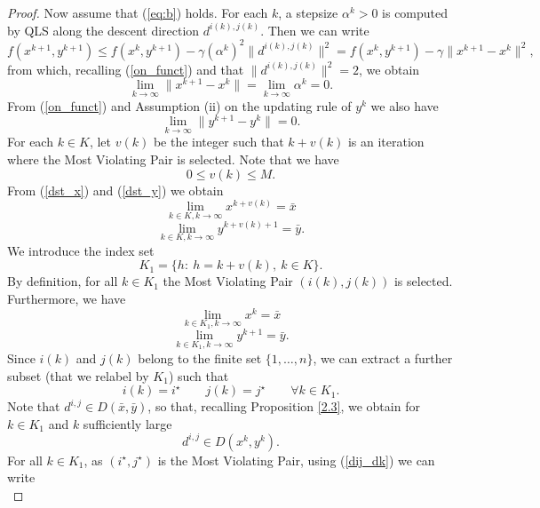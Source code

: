 \begin{proof}
Now assume that (\ref{eq:b}) holds.
For each $k$, a stepsize $\alpha^k>0$ is computed by QLS along the descent direction $d^{i(k),j(k)}$.
Then we can write
\begin{equation}\label{red_funct}
 f(x^{k+1},y^{k+1})\le f(x^k,y^{k+1})-\gamma (\alpha^k)^2\|d^{i(k),j(k)}\|^2=f(x^k,y^{k+1})-\gamma\|x^{k+1}-x^k\|^2,
\end{equation}
from which, recalling (\ref{on_funct}) and that $\|d^{i(k),j(k)}\|^2=2$, we obtain
\begin{equation}\label{dst_x}
 \lim_{k\to\infty}\|x^{k+1}-x^k\|=\lim_{k\to\infty}\alpha^k=0.
\end{equation} 
From (\ref{on_funct}) and Assumption (ii) on the updating rule of $y^k$ we also have
\begin{equation}\label{dst_y}
 \lim_{k\to\infty}\|y^{k+1}-y^k\|=0.
\end{equation}
For each $k\in K$, let $v(k)$ be the integer such that $k+v(k)$ is an iteration
where the Most Violating Pair is selected. Note that we have
$$
0\le v(k) \le M.
$$
From (\ref{dst_x}) and (\ref{dst_y}) we obtain
\begin{equation}\label{cnv_x}
 \lim_{k\in K,k\to\infty}x^{k+v(k)}=\bar x
\end{equation}
\begin{equation}\label{cnv_y}
 \lim_{k\in K,k\to\infty}y^{k+v(k)+1}=\bar y.
\end{equation}
We introduce the index set 
$$
K_1=\{h: \ h=k+v(k), \ k\in K\}.
$$
By definition, for all $k\in K_1$ the Most Violating Pair $(i(k),j(k))$ is selected. Furthermore, we have
\begin{equation}\label{cnv2_x}
 \lim_{k\in K_1,k\to\infty}x^{k}=\bar x
\end{equation}
\begin{equation}\label{cnv2_y}
 \lim_{k\in K_1,k\to\infty}y^{k+1}=\bar y.
\end{equation}
Since $i(k)$ and $j(k)$ belong to the finite set $\{1,\ldots ,n\}$, we can extract a further subset (that we relabel by $K_1$) such that
$$
i(k)=i^\star \quad\quad j(k)=j^\star\quad\quad \forall k\in K_1.
$$
Note that $d^{i,j}\in D(\bar x,\bar y)$, so that, recalling Proposition \ref{2.3}, we obtain for
$k\in K_1$ and $k$ sufficiently large
\begin{equation}\label{dij_dk}
 d^{i,j}\in D(x^k,y^k).
\end{equation}
For all $k\in K_1$, as $(i^\star,j^\star)$ is the Most Violating Pair, using (\ref{dij_dk}) we can write
\begin{equation}\label{mvp_ij}

\end{equation}
\end{proof}
